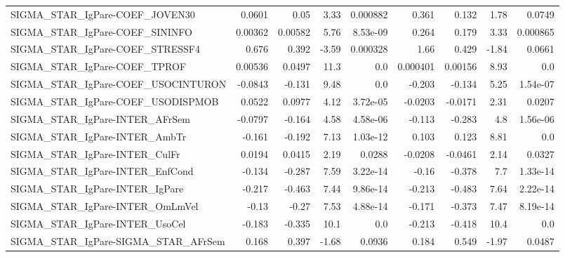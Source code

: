 \begin{tabular}{lrrrrrrrr}
SIGMA\_STAR\_IgPare-COEF\_JOVEN30        &      0.0601 &         0.05 &    3.33 & 0.000882 &      0.361 &       0.132 &         1.78 &        0.0749 \\
SIGMA\_STAR\_IgPare-COEF\_SININFO        &     0.00362 &      0.00582 &    5.76 & 8.53e-09 &      0.264 &       0.179 &         3.33 &      0.000865 \\
SIGMA\_STAR\_IgPare-COEF\_STRESSF4       &       0.676 &        0.392 &   -3.59 & 0.000328 &       1.66 &       0.429 &        -1.84 &        0.0661 \\
SIGMA\_STAR\_IgPare-COEF\_TPROF          &     0.00536 &       0.0497 &    11.3 &      0.0 &   0.000401 &     0.00156 &         8.93 &           0.0 \\
SIGMA\_STAR\_IgPare-COEF\_USOCINTURON    &     -0.0843 &       -0.131 &    9.48 &      0.0 &     -0.203 &      -0.134 &         5.25 &      1.54e-07 \\
SIGMA\_STAR\_IgPare-COEF\_USODISPMOB     &      0.0522 &       0.0977 &    4.12 & 3.72e-05 &    -0.0203 &     -0.0171 &         2.31 &        0.0207 \\
SIGMA\_STAR\_IgPare-INTER\_AFrSem        &     -0.0797 &       -0.164 &    4.58 & 4.58e-06 &     -0.113 &      -0.283 &          4.8 &      1.56e-06 \\
SIGMA\_STAR\_IgPare-INTER\_AmbTr         &      -0.161 &       -0.192 &    7.13 & 1.03e-12 &      0.103 &       0.123 &         8.81 &           0.0 \\
SIGMA\_STAR\_IgPare-INTER\_CulFr         &      0.0194 &       0.0415 &    2.19 &   0.0288 &    -0.0208 &     -0.0461 &         2.14 &        0.0327 \\
SIGMA\_STAR\_IgPare-INTER\_EnfCond       &      -0.134 &       -0.287 &    7.59 & 3.22e-14 &      -0.16 &      -0.378 &          7.7 &      1.33e-14 \\
SIGMA\_STAR\_IgPare-INTER\_IgPare        &      -0.217 &       -0.463 &    7.44 & 9.86e-14 &     -0.213 &      -0.483 &         7.64 &      2.22e-14 \\
SIGMA\_STAR\_IgPare-INTER\_OmLmVel       &       -0.13 &        -0.27 &    7.53 & 4.88e-14 &     -0.171 &      -0.373 &         7.47 &      8.19e-14 \\
SIGMA\_STAR\_IgPare-INTER\_UsoCel        &      -0.183 &       -0.335 &    10.1 &      0.0 &     -0.213 &      -0.418 &         10.4 &           0.0 \\
SIGMA\_STAR\_IgPare-SIGMA\_STAR\_AFrSem   &       0.168 &        0.397 &   -1.68 &   0.0936 &      0.184 &       0.549 &        -1.97 &        0.0487 \\

\end{tabular}
